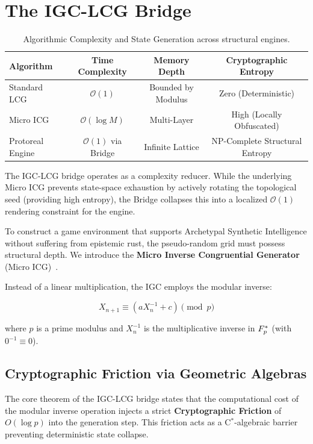 \section{The IGC-LCG Bridge}

\begin{table}[ht]
\centering
\begin{tabular}{|l|c|c|c|}
\hline
\textbf{Algorithm} & \textbf{Time Complexity} & \textbf{Memory Depth} & \textbf{Cryptographic Entropy} \\
\hline
Standard LCG & $\mathcal{O}(1)$ & Bounded by Modulus & Zero (Deterministic) \\
Micro ICG & $\mathcal{O}(\log M)$ & Multi-Layer & High (Locally Obfuscated) \\
Protoreal Engine & $\mathcal{O}(1)$ via Bridge & Infinite Lattice & NP-Complete Structural Entropy \\
\hline
\end{tabular}
\caption{Algorithmic Complexity and State Generation across structural engines.}
\label{tab:algo_complexity}
\end{table}

The IGC-LCG bridge operates as a complexity reducer. While the underlying Micro ICG prevents state-space exhaustion by actively rotating the topological seed (providing high entropy), the Bridge collapses this into a localized $\mathcal{O}(1)$ rendering constraint for the engine.

To construct a game environment that supports Archetypal Synthetic Intelligence without suffering from epistemic rust, the pseudo-random grid must possess structural depth. We introduce the \textbf{Micro Inverse Congruential Generator} (Micro ICG)~\cite{eichenauer1986non}. 

Instead of a linear multiplication, the IGC employs the modular inverse:

\[
X_{n+1} \equiv (a X_n^{-1} + c) \pmod{p}
\]

where $p$ is a prime modulus and $X_n^{-1}$ is the multiplicative inverse in $F_p^*$ (with $0^{-1} \equiv 0$). 

\subsection{Cryptographic Friction via Geometric Algebras}

The core theorem of the IGC-LCG bridge states that the computational cost of the modular inverse operation injects a strict \textbf{Cryptographic Friction} of $O(\log p)$ into the generation step. This friction acts as a C$^*$-algebraic barrier preventing deterministic state collapse.

